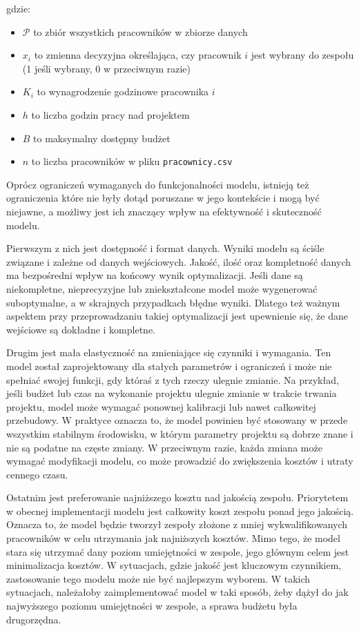 \begin{description}
    gdzie:
    \begin{itemize}
        \item $\mathcal{P}$ to zbiór wszystkich pracowników w zbiorze danych
        \item $x_i$ to zmienna decyzyjna określająca, czy pracownik $i$ jest wybrany do zespołu (1 jeśli wybrany, 0 w przeciwnym razie)
        \item $K_i$ to wynagrodzenie godzinowe pracownika $i$
        \item $h$ to liczba godzin pracy nad projektem
        \item $B$ to maksymalny dostępny budżet
        \item $n$ to liczba pracowników w pliku \verb|pracownicy.csv|
    \end{itemize}
\end{description}

\par Oprócz ograniczeń wymaganych do funkcjonalności modelu, istnieją też ograniczenia które nie były dotąd poruszane w jego kontekście i mogą być niejawne, a możliwy jest ich znaczący wpływ na efektywność i skuteczność modelu.

\par Pierwszym z nich jest dostępność i format danych. Wyniki modelu są ściśle związane i zależne od danych wejściowych. Jakość, ilość oraz kompletność danych ma bezpośredni wpływ na końcowy wynik optymalizacji. Jeśli dane są niekompletne, nieprecyzyjne lub zniekształcone model może wygenerować suboptymalne, a w skrajnych przypadkach błędne wyniki. Dlatego też ważnym aspektem przy przeprowadzaniu takiej optymalizacji jest upewnienie się, że dane wejściowe są dokładne i kompletne.

\par Drugim jest mała elastyczność na zmieniające się czynniki i wymagania. Ten model został zaprojektowany dla stałych parametrów i ograniczeń i może nie spełniać swojej funkcji, gdy któraś z tych rzeczy ulegnie zmianie. Na przykład, jeśli budżet lub czas na wykonanie projektu ulegnie zmianie w trakcie trwania projektu, model może wymagać ponownej kalibracji lub nawet całkowitej przebudowy. W praktyce oznacza to, że model powinien być stosowany w przede wszystkim stabilnym środowisku, w którym parametry projektu są dobrze znane i nie są podatne na częste zmiany. W przeciwnym razie, każda zmiana może wymagać modyfikacji modelu, co może prowadzić do zwiększenia kosztów i utraty cennego czasu. 

\par Ostatnim jest preferowanie najniższego kosztu nad jakością zespołu. Priorytetem w obecnej implementacji modelu jest całkowity koszt zespołu ponad jego jakością. Oznacza to, że model będzie tworzył zespoły złożone z mniej wykwalifikowanych pracowników w celu utrzymania jak najniższych kosztów. Mimo tego, że model stara się utrzymać dany poziom umiejętności w zespole, jego głównym celem jest minimalizacja kosztów. W sytuacjach, gdzie jakość jest kluczowym czynnikiem, zastosowanie tego modelu może nie być najlepszym wyborem. W takich sytuacjach, należałoby zaimplementować model w taki sposób, żeby dążył do jak najwyższego poziomu umiejętności w zespole, a sprawa budżetu była drugorzędna.

